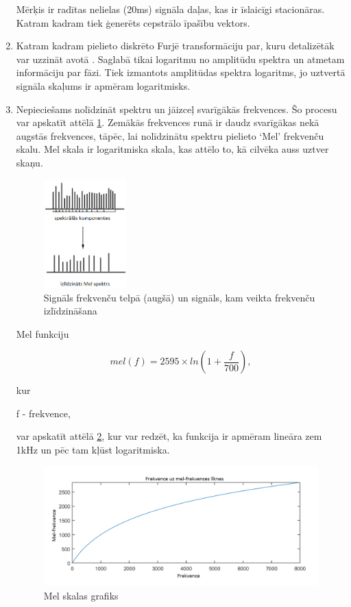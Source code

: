 \documentclass[12pt,paper=A4]{report}
\begin{document}
\begin{enumerate}
Mērķis ir radītas nelielas (20ms) signāla daļas, kas ir īslaicīgi stacionāras. Katram kadram tiek ģenerēts cepstrālo īpašību vektors.
\item Katram kadram pielieto diskrēto Furjē transformāciju par, kuru detalizētāk var uzzināt avotā \cite{diskrete}. Saglabā tikai logaritmu no amplitūdu spektra un atmetam informāciju par fāzi. Tiek izmantots amplitūdas spektra logaritms, jo uztvertā signāla skaļums ir apmēram logaritmisks. 
\item Nepieciešams nolīdzināt spektru un jāizceļ svarīgākās frekvences. Šo procesu var apskatīt attēlā \ref{minimize-freq}. Zemākās frekvences runā ir daudz svarīgākas nekā augstās frekvences, tāpēc, lai nolīdzinātu spektru pielieto ‘Mel’ frekvenču skalu. Mel skala ir logaritmiska skala, kas attēlo to, kā cilvēka auss
uztver skaņu. 

  \begin{figure}[H] \centering
\includegraphics[width=0.30\textwidth]{dsf} 
\caption{Signāls frekvenču telpā (augšā) un signāls, kam veikta frekvenču izlīdzināšana \cite{dtw12}}  \label{minimize-freq} 
\end{figure}
Mel funkciju 

\begin{equation}
mel(f)=2595 \times ln(1+\frac{f}{700}),
\end{equation}

kur 

f - frekvence,

var apskatīt attēlā \ref{mel}, kur var redzēt, ka funkcija ir apmēram lineāra zem 1kHz un pēc tam kļūst logaritmiska.

 \begin{figure}[H] \centering
\includegraphics[width=1.00\textwidth]{mel} 
\caption{Mel skalas grafiks \cite{MFCC}}  \label{mel} 
\end{figure}



\end{enumerate}
\end{document}
